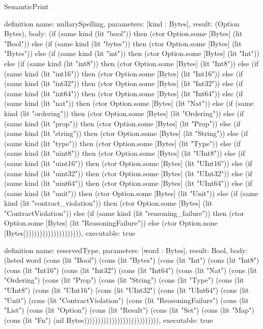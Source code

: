 \begin{lexlean}{SemanticPrint}
\begin{semanticmodule}
definition{
  name: nullarySpelling,
  parameters: [kind : Bytes],
  result: (Option Bytes),
  body: (if (same kind (lit "bool")) then (ctor Option.some [Bytes] (lit "Bool")) else (if (same kind (lit "bytes")) then (ctor Option.some [Bytes] (lit "Bytes")) else (if (same kind (lit "int")) then (ctor Option.some [Bytes] (lit "Int")) else (if (same kind (lit "int8")) then (ctor Option.some [Bytes] (lit "Int8")) else (if (same kind (lit "int16")) then (ctor Option.some [Bytes] (lit "Int16")) else (if (same kind (lit "int32")) then (ctor Option.some [Bytes] (lit "Int32")) else (if (same kind (lit "int64")) then (ctor Option.some [Bytes] (lit "Int64")) else (if (same kind (lit "nat")) then (ctor Option.some [Bytes] (lit "Nat")) else (if (same kind (lit "ordering")) then (ctor Option.some [Bytes] (lit "Ordering")) else (if (same kind (lit "prop")) then (ctor Option.some [Bytes] (lit "Prop")) else (if (same kind (lit "string")) then (ctor Option.some [Bytes] (lit "String")) else (if (same kind (lit "type")) then (ctor Option.some [Bytes] (lit "Type")) else (if (same kind (lit "uint8")) then (ctor Option.some [Bytes] (lit "UInt8")) else (if (same kind (lit "uint16")) then (ctor Option.some [Bytes] (lit "UInt16")) else (if (same kind (lit "uint32")) then (ctor Option.some [Bytes] (lit "UInt32")) else (if (same kind (lit "uint64")) then (ctor Option.some [Bytes] (lit "UInt64")) else (if (same kind (lit "unit")) then (ctor Option.some [Bytes] (lit "Unit")) else (if (same kind (lit "contract_violation")) then (ctor Option.some [Bytes] (lit "ContractViolation")) else (if (same kind (lit "reasoning_failure")) then (ctor Option.some [Bytes] (lit "ReasoningFailure")) else (ctor Option.none [Bytes])))))))))))))))))))),
  executable: true
}

definition{
  name: reservedType,
  parameters: [word : Bytes],
  result: Bool,
  body: (listed word (cons (lit "Bool") (cons (lit "Bytes") (cons (lit "Int") (cons (lit "Int8") (cons (lit "Int16") (cons (lit "Int32") (cons (lit "Int64") (cons (lit "Nat") (cons (lit "Ordering") (cons (lit "Prop") (cons (lit "String") (cons (lit "Type") (cons (lit "UInt8") (cons (lit "UInt16") (cons (lit "UInt32") (cons (lit "UInt64") (cons (lit "Unit") (cons (lit "ContractViolation") (cons (lit "ReasoningFailure") (cons (lit "List") (cons (lit "Option") (cons (lit "Result") (cons (lit "Set") (cons (lit "Map") (cons (lit "Fn") (nil Bytes))))))))))))))))))))))))))),
  executable: true
}


\end{semanticmodule}
\end{lexlean}
